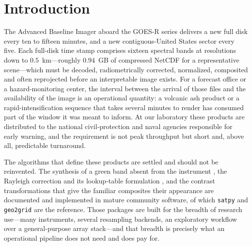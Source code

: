 \documentclass[11pt]{article}
\begin{document}
%

\section{Introduction}
\label{sec:intro}

The Advanced Baseline Imager aboard the GOES-R series delivers a new full disk
every ten to fifteen minutes, and a new contiguous-United States sector every
five. Each full-disk time stamp comprises sixteen spectral bands at resolutions
down to $0.5$~km---roughly $0.94$~GB of compressed NetCDF for a representative
scene---which must be decoded, radiometrically corrected, normalized, composited
and often reprojected before an interpretable image exists. For a forecast
office or a hazard-monitoring center, the interval between the arrival of those
files and the availability of the image is an operational quantity: a volcanic
ash product or a rapid-intensification sequence that takes several minutes to
render has consumed part of the window it was meant to inform. At our
laboratory these products are distributed to the national civil-protection and
naval agencies responsible for early warning, and the requirement is not peak
throughput but short and, above all, predictable turnaround.

The algorithms that define these products are settled and should not be
reinvented. The synthesis of a green band absent from the instrument
\citep{Bah2018,Miller2016}, the Rayleigh correction and its lookup-table
formulation \citep{Bucholtz1995,Bodhaine1999,Scheirer2018,PySpectralLUT2018},
and the contrast transformations that give the familiar composites their
appearance are documented and implemented in mature community software, of
which \texttt{satpy} and \texttt{geo2grid} \citep{Geo2Grid2026} are the
reference. Those packages are built for the breadth of research use---many
instruments, several resampling backends, an exploratory workflow over a
general-purpose array stack---and that breadth is precisely what an operational
pipeline does not need and does pay for.
\end{document}
